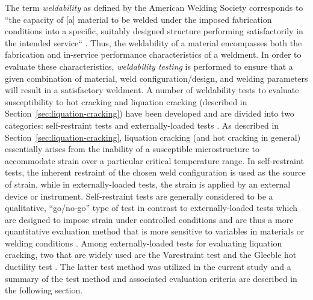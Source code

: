 The term \emph{weldability} as defined by the American Welding Society corresponds to “the capacity of [a] material to be welded under the imposed fabrication conditions into a specific, suitably designed structure performing satisfactorily in the intended service“ \cite{aws_terms_2010}. Thus, the weldability of a material encompasses both the fabrication and in-service performance characteristics of a weldment. In order to evaluate these characteristics, \emph{weldability testing} is performed to ensure that a given combination of material, weld configuration/design, and welding parameters will result in a satisfactory weldment. A number of weldability tests to evaluate susceptibility to hot cracking and liquation cracking (described in Section~\ref{sec:liquation-cracking}) have been developed and are divided into two categories: self-restraint tests and externally-loaded tests \cite{farrar_hot_2005}. As described in Section~\ref{sec:liquation-cracking}, liquation cracking (and hot cracking in general) essentially arises from the inability of a susceptible microstructure to accommodate strain over a particular critical temperature range. In self-restraint tests, the inherent restraint of the chosen weld configuration is used as the source of strain, while in externally-loaded tests, the strain is applied by an external device or instrument. Self-restraint tests are generally considered to be a qualitative, “go/no-go” type of test in contrast to externally-loaded tests which are designed to impose strain under controlled conditions and are thus a more quantitative evaluation method that is more sensitive to variables in materials or welding conditions \cite{farrar_hot_2005}. Among externally-loaded tests for evaluating liquation cracking, two that are widely used are the Varestraint test \cite{lundin_varestraint_1965} and the Gleeble\texttrademark{} hot ductility test \cite{nippes_investigation_1955}. The latter test method was utilized in the current study and a summary of the test method and associated evaluation criteria are described in the following section.




